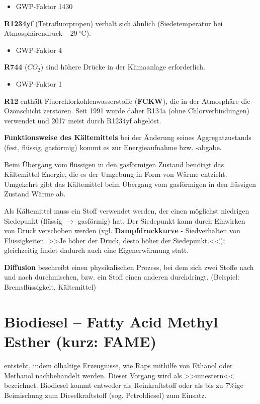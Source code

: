\begin{itemize}
\item
  GWP-Faktor 1430
\end{itemize}

\textbf{R1234yf} (Tetrafluorpropen) verhält sich ähnlich
(Siedetemperatur bei Atmosphärendruck $-29~^\circ\text{C}$).

\begin{itemize}
\item
  GWP-Faktor 4
\end{itemize}

\textbf{R744} ($CO_2$) sind höhere Drücke in der Klimaanlage
erforderlich.

\begin{itemize}
\item
  GWP-Faktor 1
\end{itemize}

\textbf{R12} enthält Fluorchlorkohlenwasserstoffe (\textbf{FCKW}), die
in der Atmosphäre die Ozonschicht zerstören. Seit 1991 wurde daher R134a
(ohne Chlorverbindungen) verwendet und 2017 meist durch R1234yf
abgelöst.

\textbf{Funktionsweise des Kältemittels} bei der Änderung seines
Aggregatzustands (fest, flüssig, gasförmig) kommt es zur Energieaufnahme
bzw. -abgabe.

Beim Übergang vom flüssigen in den gasförmigen Zustand benötigt das
Kältemittel Energie, die es der Umgebung in Form von Wärme entzieht.
Umgekehrt gibt das Kältemittel beim Übergang vom gasförmigen in den
flüssigen Zustand Wärme ab.

Als Kältemittel muss ein Stoff verwendet werden, der einen möglichst
niedrigen Siedepunkt (flüssig $\to$ gasförmig) hat. Der Siedepunkt
kann durch Einwirken von Druck verschoben werden (vgl.
\textbf{Dampfdruckkurve} - Siedverhalten von Flüssigkeiten. >>Je höher
der Druck, desto höher der Siedepunkt.<<); gleichzeitig findet dadurch
auch eine Eigenerwärmung statt.

\textbf{Diffusion} beschreibt einen physikalischen Prozess, bei dem sich
zwei Stoffe nach und nach durchmischen, bzw. ein Stoff einen anderen
durchdringt. (Beispiel: Bremsflüssigkeit, Kältemittel)

\section{Biodiesel -- Fatty Acid Methyl Esther (kurz:
FAME)}\label{biodiesel-fatty-acid-methyl-esther-kurz-fame}

entsteht, indem ölhaltige Erzeugnisse, wie Raps mithilfe von Ethanol
oder Methanol nachbehandelt werden. Dieser Vorgang wird als >>umestern<<
bezeichnet. Biodiesel kommt entweder als Reinkraftstoff oder als bis zu
7\%ige Beimischung zum Dieselkraftstoff (sog. Petroldiesel) zum Einsatz.

